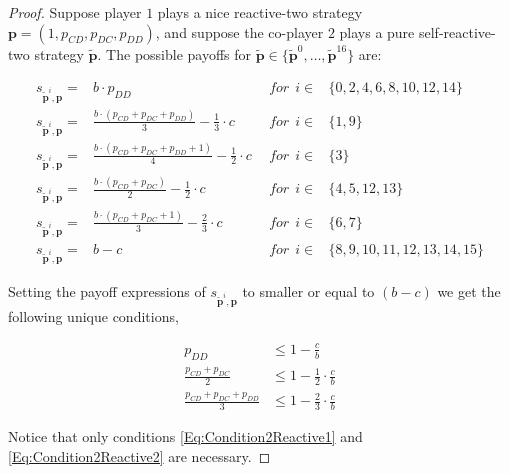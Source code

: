 \documentclass{article}
\theoremstyle{definition}
\begin{document}
\begin{proof}
Suppose player $1$ plays a nice reactive-two strategy $\mathbf{p} = (1, p_{CD},
p_{DC}, p_{DD})$, and suppose the co-player $2$ plays a pure self-reactive-two
strategy $\mathbf{\tilde{p}}$. The possible payoffs for
$\mathbf{\tilde{p}} \in \{\mathbf{\tilde{p}}^{0}, \dots, \mathbf{\tilde{p}}^{16}\}$
are:

\begin{equation*}\label{Eq:PayoffExpressionsReactiveTwo}
  \begin{array}{lclc}
    s_{\mathbf{\tilde{p}}^{i}, \mathbf{p}} = & b \cdot p_{DD} & ~~for~~ i \in & \{0, 2, 4, 6, 8, 10, 12, 14\} \\ [1em]
    s_{\mathbf{\tilde{p}}^{i}, \mathbf{p}} = & \frac{b \cdot (p_{CD} + p_{DC} + p_{DD})}{3} - \frac{1}{3} \cdot c  &  ~~for~~ i \in & \{1, 9\} \\ [1em]
    s_{\mathbf{\tilde{p}}^{i}, \mathbf{p}} = & \frac{b \cdot (p_{CD} + p_{DC} + p_{DD} + 1)}{4} - \frac{1}{2} \cdot c  & ~~for~~ i \in & \{3\} \\ [1em]
    s_{\mathbf{\tilde{p}}^{i}, \mathbf{p}} = & \frac{b \cdot (p_{CD} + p_{DC})}{2} - \frac{1}{2} \cdot c  & ~~for~~ i \in & \{4, 5, 12, 13\} \\ [1em]
    s_{\mathbf{\tilde{p}}^{i}, \mathbf{p}} = & \frac{b \cdot (p_{CD} + p_{DC} + 1)}{3} - \frac{2}{3} \cdot c  &  ~~for~~ i \in & \{6, 7\}\\ [1em]
    s_{\mathbf{\tilde{p}}^{i}, \mathbf{p}} = & b - c  & ~~for~~ i \in & \{8, 9, 10, 11, 12, 13, 14, 15\}
  \end{array}
\end{equation*}

Setting the payoff expressions of $s_{\mathbf{\tilde{p}}^{i}, \mathbf{p}}$ to
smaller or equal to $(b - c)$ we get the following unique conditions,

\begin{align} 
  p_{DD} & \leq 1 - \frac{c}{b} \label{Eq:Condition2Reactive1} \\
  \frac{p_{CD} + p_{DC}}{2} & \leq 1 - \frac{1}{2}  \cdot \frac{c}{b} \label{Eq:Condition2Reactive2} \\
  \frac{p_{CD} + p_{DC} + p_{DD}}{3} & \leq 1 - \frac{2}{3} \cdot \frac{c}{b} \label{Eq:Condition2Reactive3}
\end{align}

Notice that only conditions \eqref{Eq:Condition2Reactive1} and
\eqref{Eq:Condition2Reactive2} are necessary.

\end{proof}
\end{document}

